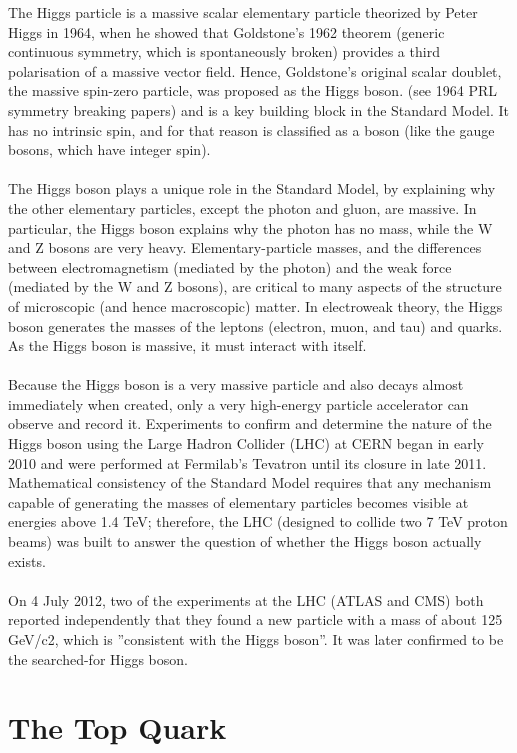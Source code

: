 The Higgs particle is a massive scalar elementary particle theorized by Peter Higgs in 1964, when he showed that Goldstone's 1962 theorem (generic continuous symmetry, which is spontaneously broken) provides a third polarisation of a massive vector field. Hence, Goldstone's original scalar doublet, the massive spin-zero particle, was proposed as the Higgs boson. (see 1964 PRL symmetry breaking papers) and is a key building block in the Standard Model. It has no intrinsic spin, and for that reason is classified as a boson (like the gauge bosons, which have integer spin).\\ \\
The Higgs boson plays a unique role in the Standard Model, by explaining why the other elementary particles, except the photon and gluon, are massive. In particular, the Higgs boson explains why the photon has no mass, while the W and Z bosons are very heavy. Elementary-particle masses, and the differences between electromagnetism (mediated by the photon) and the weak force (mediated by the W and Z bosons), are critical to many aspects of the structure of microscopic (and hence macroscopic) matter. In electroweak theory, the Higgs boson generates the masses of the leptons (electron, muon, and tau) and quarks. As the Higgs boson is massive, it must interact with itself.\\ \\
Because the Higgs boson is a very massive particle and also decays almost immediately when created, only a very high-energy particle accelerator can observe and record it. Experiments to confirm and determine the nature of the Higgs boson using the Large Hadron Collider (LHC) at CERN began in early 2010 and were performed at Fermilab's Tevatron until its closure in late 2011. Mathematical consistency of the Standard Model requires that any mechanism capable of generating the masses of elementary particles becomes visible at energies above 1.4 TeV; therefore, the LHC (designed to collide two 7 TeV proton beams) was built to answer the question of whether the Higgs boson actually exists.\\ \\
On 4 July 2012, two of the experiments at the LHC (ATLAS and CMS) both reported independently that they found a new particle with a mass of about 125 GeV/c2, which is ''consistent with the Higgs boson''. It was later confirmed to be the searched-for Higgs boson.

\section{The Top Quark}
\label{sec:theory_top}

